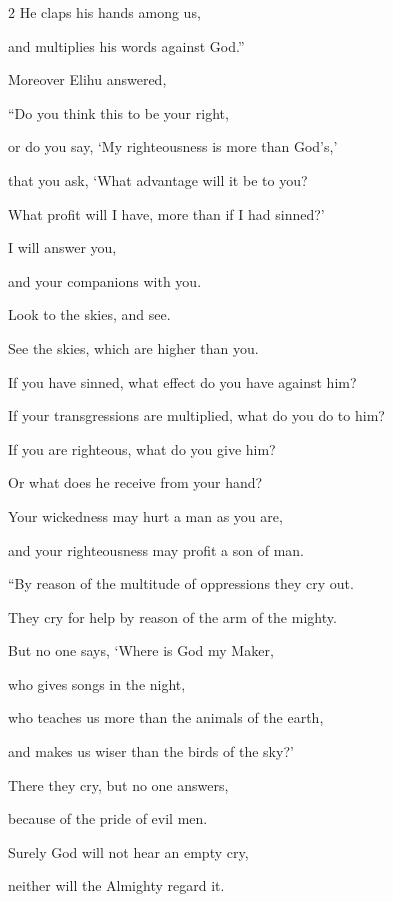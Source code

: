 \begin{multicols}{2}
	He claps his hands among us,
	
	and multiplies his words against God.”
	
	
	
	\mychapter{} \myverse*{}Moreover Elihu answered,
	
	\quad\quad \myverse{}“Do you think this to be your right,
	
	or do you say, ‘My righteousness is more than God’s,’
	
	\myverse{}that you ask, ‘What advantage will it be to you?
	
	What profit will I have, more than if I had sinned?’
	
	\myverse{}I will answer you,
	
	and your companions with you.
	
	\myverse{}Look to the skies, and see.
	
	See the skies, which are higher than you.
	
	\myverse{}If you have sinned, what effect do you have against him?
	
	If your transgressions are multiplied, what do you do to him?
	
	\myverse{}If you are righteous, what do you give him?
	
	Or what does he receive from your hand?
	
	\myverse{}Your wickedness may hurt a man as you are,
	
	and your righteousness may profit a son of man.
	
	\vspace{\baselineskip}
	
	\myverse{}“By reason of the multitude of oppressions they cry out.
	
	They cry for help by reason of the arm of the mighty.
	
	\myverse{}But no one says, ‘Where is God my Maker,
	
	who gives songs in the night,
	
	\myverse{}who teaches us more than the animals of the earth,
	
	and makes us wiser than the birds of the sky?’
	
	\myverse{}There they cry, but no one answers,
	
	because of the pride of evil men.
	
	\myverse{}Surely God will not hear an empty cry,
	
	neither will the Almighty regard it.
	

\end{multicols}
